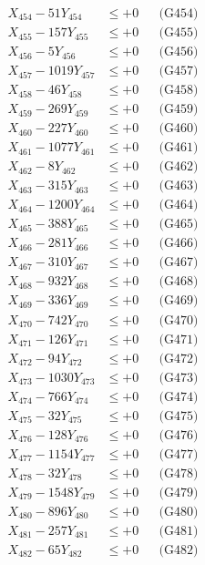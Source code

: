 \documentclass[a4paper,10pt]{article}
\begin{document}
{\begin{align}
X_{454} - 51Y_{454} &\leq +0 && \text{(G454)} \\
X_{455} - 157Y_{455} &\leq +0 && \text{(G455)} \\
X_{456} - 5Y_{456} &\leq +0 && \text{(G456)} \\
X_{457} - 1019Y_{457} &\leq +0 && \text{(G457)} \\
X_{458} - 46Y_{458} &\leq +0 && \text{(G458)} \\
X_{459} - 269Y_{459} &\leq +0 && \text{(G459)} \\
X_{460} - 227Y_{460} &\leq +0 && \text{(G460)} \\
\allowbreak
X_{461} - 1077Y_{461} &\leq +0 && \text{(G461)} \\
X_{462} - 8Y_{462} &\leq +0 && \text{(G462)} \\
X_{463} - 315Y_{463} &\leq +0 && \text{(G463)} \\
X_{464} - 1200Y_{464} &\leq +0 && \text{(G464)} \\
X_{465} - 388Y_{465} &\leq +0 && \text{(G465)} \\
X_{466} - 281Y_{466} &\leq +0 && \text{(G466)} \\
X_{467} - 310Y_{467} &\leq +0 && \text{(G467)} \\
X_{468} - 932Y_{468} &\leq +0 && \text{(G468)} \\
X_{469} - 336Y_{469} &\leq +0 && \text{(G469)} \\
X_{470} - 742Y_{470} &\leq +0 && \text{(G470)} \\
\allowbreak
X_{471} - 126Y_{471} &\leq +0 && \text{(G471)} \\
X_{472} - 94Y_{472} &\leq +0 && \text{(G472)} \\
X_{473} - 1030Y_{473} &\leq +0 && \text{(G473)} \\
X_{474} - 766Y_{474} &\leq +0 && \text{(G474)} \\
X_{475} - 32Y_{475} &\leq +0 && \text{(G475)} \\
X_{476} - 128Y_{476} &\leq +0 && \text{(G476)} \\
X_{477} - 1154Y_{477} &\leq +0 && \text{(G477)} \\
X_{478} - 32Y_{478} &\leq +0 && \text{(G478)} \\
X_{479} - 1548Y_{479} &\leq +0 && \text{(G479)} \\
X_{480} - 896Y_{480} &\leq +0 && \text{(G480)} \\
\allowbreak
X_{481} - 257Y_{481} &\leq +0 && \text{(G481)} \\
X_{482} - 65Y_{482} &\leq +0 && \text{(G482)} \\

\end{align}}
\end{document}

